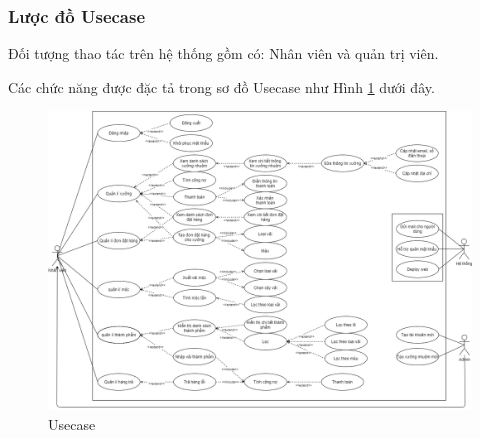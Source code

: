 \subsubsection{Lược đồ Usecase}
Đối tượng thao tác trên hệ thống gồm có: Nhân viên và quản trị viên.\par
Các chức năng được đặc tả trong sơ đồ Usecase như Hình \ref{usecase} dưới đây.

\begin{figure}[H]
    \begin{center}
        \includegraphics[width=16cm]{Image/General/Usecase.png}
        \caption{Usecase}
        \label{usecase}
    \end{center}
\end{figure}

\newpage
